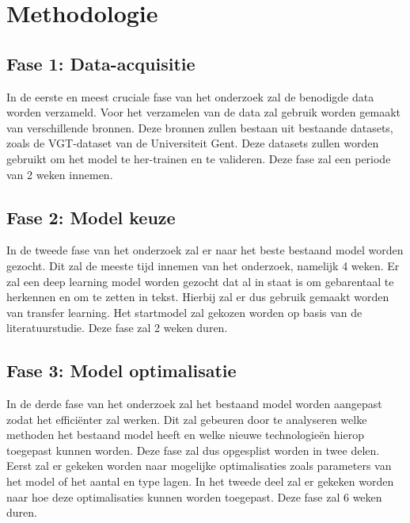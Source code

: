 
\section{Methodologie}%
\label{sec:methodologie}
\subsection{Fase 1: Data-acquisitie}
In de eerste en meest cruciale fase van het onderzoek zal de benodigde data worden verzameld.
Voor het verzamelen van de data zal gebruik worden gemaakt van verschillende bronnen.
Deze bronnen zullen bestaan uit bestaande datasets, zoals de VGT-dataset van de Universiteit Gent.
Deze datasets zullen worden gebruikt om het model te her-trainen en te valideren.
Deze fase zal een periode van 2 weken innemen.
\subsection{Fase 2: Model keuze}
In de tweede fase van het onderzoek zal er naar het beste bestaand model worden gezocht.
Dit zal de meeste tijd innemen van het onderzoek, namelijk 4 weken.
Er zal een deep learning model worden gezocht dat al in staat is om gebarentaal te herkennen en om te zetten in tekst.
Hierbij zal er dus gebruik gemaakt worden van transfer learning.
Het startmodel zal gekozen worden op basis van de literatuurstudie.
Deze fase zal 2 weken duren.
\subsection{Fase 3: Model optimalisatie}
In de derde fase van het onderzoek zal het bestaand model worden aangepast zodat het effici{\"e}nter zal werken.
Dit zal gebeuren door te analyseren welke methoden het bestaand model heeft en welke nieuwe technologieën hierop toegepast kunnen worden.
Deze fase zal dus opgesplist worden in twee delen.
Eerst zal er gekeken worden naar mogelijke optimalisaties zoals parameters van het model of het aantal en type lagen.
In het tweede deel zal er gekeken worden naar hoe deze optimalisaties kunnen worden toegepast.
Deze fase zal 6 weken duren.
